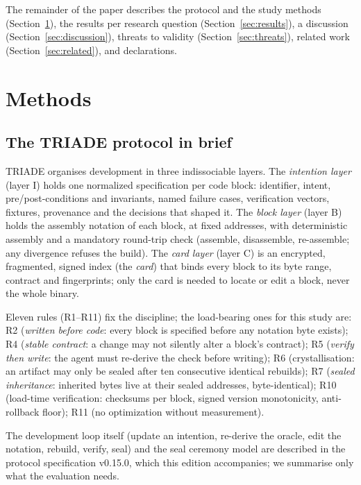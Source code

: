 \documentclass[11pt,a4paper]{article}
\begin{document}
The remainder of the paper describes the protocol and the study methods
(Section~\ref{sec:methods}), the results per research question
(Section~\ref{sec:results}), a discussion (Section~\ref{sec:discussion}),
threats to validity (Section~\ref{sec:threats}), related work
(Section~\ref{sec:related}), and declarations.

\section{Methods}\label{sec:methods}

\subsection{The TRIADE protocol in brief}\label{sec:protocole}

TRIADE organises development in three indissociable layers. The
\emph{intention layer} (layer I) holds one normalized specification per
code block: identifier, intent, pre/post-conditions and invariants, named
failure cases, verification vectors, fixtures, provenance and the
decisions that shaped it. The \emph{block layer} (layer B) holds the
assembly notation of each block, at fixed addresses, with deterministic
assembly and a mandatory round-trip check (assemble, disassemble,
re-assemble; any divergence refuses the build). The \emph{card layer}
(layer C) is an encrypted, fragmented, signed index (the \emph{card}) that
binds every block to its byte range, contract and fingerprints; only the
card is needed to locate or edit a block, never the whole binary.

Eleven rules (R1--R11) fix the discipline; the load-bearing ones for this
study are: R2 (\emph{written before code}: every block is specified before
any notation byte exists); R4 (\emph{stable contract}: a change may not
silently alter a block's contract); R5 (\emph{verify then write}: the
agent must re-derive the check before writing); R6 (crystallisation: an
artifact may only be sealed after ten consecutive identical rebuilds);
R7 (\emph{sealed inheritance}: inherited bytes live at their sealed
addresses, byte-identical); R10 (load-time verification: checksums per
block, signed version monotonicity, anti-rollback floor); R11 (no
optimization without measurement).

The development loop itself (update an intention, re-derive the oracle,
edit the notation, rebuild, verify, seal) and the seal ceremony model are
described in the protocol specification v0.15.0, which this edition
accompanies; we summarise only what the evaluation needs.
\end{document}
